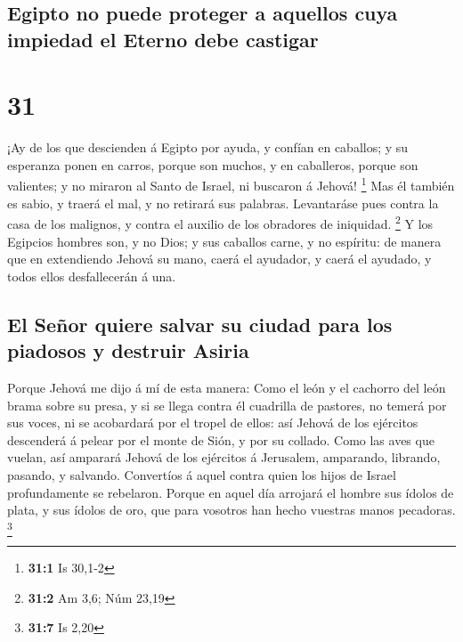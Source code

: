 \hypertarget{egipto-no-puede-proteger-a-aquellos-cuya-impiedad-el-eterno-debe-castigar}{%
\subsection{Egipto no puede proteger a aquellos cuya impiedad el Eterno
debe
castigar}\label{egipto-no-puede-proteger-a-aquellos-cuya-impiedad-el-eterno-debe-castigar}}

\hypertarget{section-30}{%
\section{31}\label{section-30}}

 ¡Ay de los que descienden á Egipto por ayuda, y confían en
caballos; y su esperanza ponen en carros, porque son muchos, y en
caballeros, porque son valientes; y no miraron al Santo de Israel, ni
buscaron á Jehová! \footnote{\textbf{31:1} Is 30,1-2}  Mas
él también es sabio, y traerá el mal, y no retirará sus palabras.
Levantaráse pues contra la casa de los malignos, y contra el auxilio de
los obradores de iniquidad. \footnote{\textbf{31:2} Am 3,6; Núm 23,19}
 Y los Egipcios hombres son, y no Dios; y sus caballos
carne, y no espíritu: de manera que en extendiendo Jehová su mano, caerá
el ayudador, y caerá el ayudado, y todos ellos desfallecerán á una.

\hypertarget{el-seuxf1or-quiere-salvar-su-ciudad-para-los-piadosos-y-destruir-asiria}{%
\subsection{El Señor quiere salvar su ciudad para los piadosos y
destruir
Asiria}\label{el-seuxf1or-quiere-salvar-su-ciudad-para-los-piadosos-y-destruir-asiria}}

 Porque Jehová me dijo á mí de esta manera: Como el león y
el cachorro del león brama sobre su presa, y si se llega contra él
cuadrilla de pastores, no temerá por sus voces, ni se acobardará por el
tropel de ellos: así Jehová de los ejércitos descenderá á pelear por el
monte de Sión, y por su collado.  Como las aves que vuelan,
así amparará Jehová de los ejércitos á Jerusalem, amparando, librando,
pasando, y salvando.  Convertíos á aquel contra quien los
hijos de Israel profundamente se rebelaron.  Porque en aquel
día arrojará el hombre sus ídolos de plata, y sus ídolos de oro, que
para vosotros han hecho vuestras manos pecadoras. \footnote{\textbf{31:7}
  Is 2,20}

